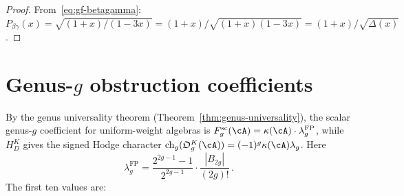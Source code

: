 \begin{proof}
From~\eqref{eq:gf-betagamma}: $P_{\beta\gamma}(x) = \sqrt{(1+x)/(1-3x)} = (1+x)/\sqrt{(1+x)(1-3x)} = (1+x)/\sqrt{\Delta(x)}$.
\end{proof}

\section*{Genus-$g$ obstruction coefficients}
\label{sec:genus-obstruction-table}

By the genus universality theorem
(Theorem~\ref{thm:genus-universality}), the scalar genus-$g$
coefficient for uniform-weight algebras is
$F_g^{\mathrm{sc}}(\cA)=\kappa(\cA) \cdot \lambda_g^{\mathrm{FP}}$,
while $H_D^K$ gives the signed Hodge character
$\operatorname{ch}_g(\mathfrak O_g^K(\cA))=
(-1)^g\kappa(\cA)\lambda_g$. Here
\[
\lambda_g^{\mathrm{FP}}
 = \frac{2^{2g-1}-1}{2^{2g-1}} \cdot \frac{|B_{2g}|}{(2g)!}\,.
\]
The first ten values are:

